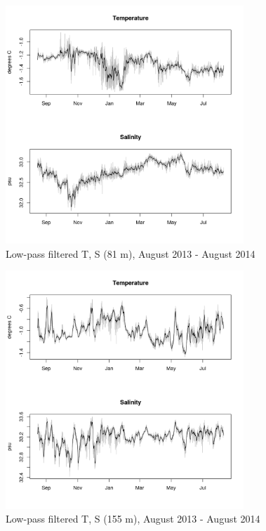 \documentclass[12pt]{dforeport}
\begin{document}
\begin{figure}  
\centering
\includegraphics[width = 0.8\textwidth]{./figures/26_lpf_TS_81m_2013_2014.png}
\caption[Low-pass filtered T, S (81 m), 2013-2014]{Low-pass filtered T, S (81 m), August 2013 - August 2014}
\label{f:ctd_81_lpf_2013_2014}
\end{figure}

\begin{figure}  
\centering
\includegraphics[width = 0.8\textwidth]{./figures/27_lpf_TS_155m_2013_2014.png}
\caption[Low-pass filtered T, S (155 m), 2013-2014]{Low-pass filtered T, S (155 m), August 2013 - August 2014}
\label{f:ctd_155_lpf_2013_2014}
\end{figure}
\end{document}

